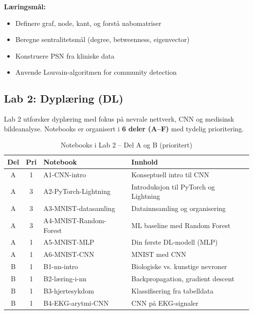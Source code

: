 \documentclass[11pt,a4paper]{article}
\begin{document}
\textbf{Læringsmål:}
\begin{itemize}[nosep]
    \item Definere graf, node, kant, og forstå nabomatriser
    \item Beregne sentralitetsmål (degree, betweenness, eigenvector)
    \item Konstruere PSN fra kliniske data
    \item Anvende Louvain-algoritmen for community detection
\end{itemize}

\subsection{Lab 2: Dyplæring (DL)}

Lab 2 utforsker dyplæring med fokus på nevrale nettverk, CNN og medisinsk bildeanalyse. Notebooks er organisert i \textbf{6 deler (A--F)} med tydelig prioritering.

\begin{table}[htbp]
\centering
\caption{Notebooks i Lab 2 -- Del A og B (prioritert)}
\label{tab:lab2ab}
\begin{tabular}{@{}cclp{5.5cm}@{}}
\toprule
\textbf{Del} & \textbf{Pri} & \textbf{Notebook} & \textbf{Innhold} \\
\midrule
A & 1 & A1-CNN-intro & Konseptuell intro til CNN \\
A & 3 & A2-PyTorch-Lightning & Introduksjon til PyTorch og Lightning \\
A & 3 & A3-MNIST-datasamling & Datainnsamling og organisering \\
A & 3 & A4-MNIST-Random-Forest & ML baseline med Random Forest \\
A & 1 & A5-MNIST-MLP & Din første DL-modell (MLP) \\
A & 1 & A6-MNIST-CNN & MNIST med CNN \\
\midrule
B & 1 & B1-nn-intro & Biologiske vs. kunstige nevroner \\
B & 1 & B2-læring-i-nn & Backpropagation, gradient descent \\
B & 1 & B3-hjertesykdom & Klassifisering fra tabelldata \\
B & 1 & B4-EKG-arytmi-CNN & CNN på EKG-signaler \\
\bottomrule
\end{tabular}
\end{table}
\end{document}
